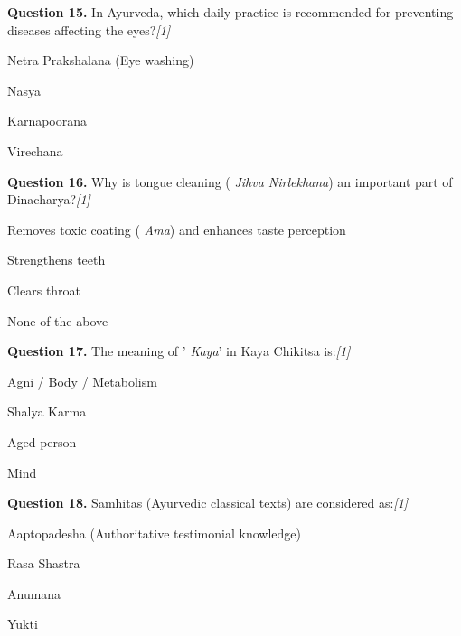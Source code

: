 \documentclass[11pt,a4paper]{article}
\newcommand{\pts}[1]{\hfill   \textit{[#1]}}
\begin{document}
\noindent   \textbf{Question 15.} In Ayurveda, which daily practice is recommended for preventing diseases affecting the eyes?\pts{1}

\begin{parts}
  \item Netra Prakshalana (Eye washing)
  \item Nasya
  \item Karnapoorana
  \item Virechana
\end{parts}

\medskip




\noindent   \textbf{Question 16.} Why is tongue cleaning (   \textit{Jihva Nirlekhana}) an important part of Dinacharya?\pts{1}

\begin{parts}
  \item Removes toxic coating (   \textit{Ama}) and enhances taste perception
  \item Strengthens teeth
  \item Clears throat
  \item None of the above
\end{parts}

\medskip




\noindent   \textbf{Question 17.} The meaning of '   \textit{Kaya}' in Kaya Chikitsa is:\pts{1}

\begin{parts}
  \item Agni / Body / Metabolism
  \item Shalya Karma
  \item Aged person
  \item Mind
\end{parts}

\medskip




\noindent   \textbf{Question 18.} Samhitas (Ayurvedic classical texts) are considered as:\pts{1}

\begin{parts}
  \item Aaptopadesha (Authoritative testimonial knowledge)
  \item Rasa Shastra
  \item Anumana
  \item Yukti
\end{parts}

\medskip
\end{document}
